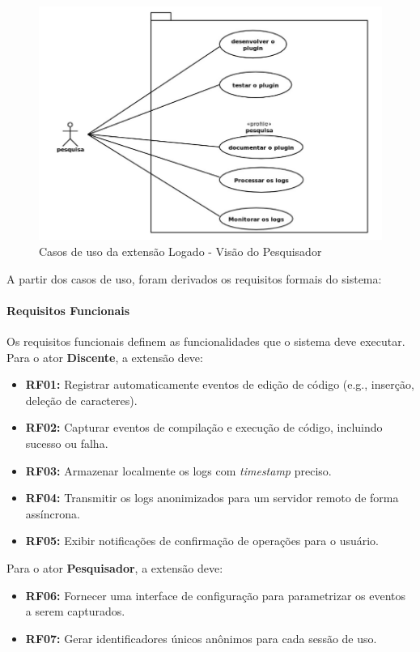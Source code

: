 \begin{figure}[H]
    \centering
    \includegraphics[width=1.1\textwidth]{../figuras/caso-de-uso-pesquisa.png}
    \caption{Casos de uso da extensão Logado - Visão do Pesquisador}
    \label{fig:casos-de-usos-pesquisa}
\end{figure}

A partir dos casos de uso, foram derivados os requisitos formais do sistema:

\paragraph{Requisitos Funcionais}
Os requisitos funcionais definem as funcionalidades que o sistema deve executar. Para o ator \textbf{Discente}, a extensão deve:
\begin{itemize}
    \item \textbf{RF01:} Registrar automaticamente eventos de edição de código (e.g., inserção, deleção de caracteres).
    \item \textbf{RF02:} Capturar eventos de compilação e execução de código, incluindo sucesso ou falha.
    \item \textbf{RF03:} Armazenar localmente os logs com \textit{timestamp} preciso.
    \item \textbf{RF04:} Transmitir os logs anonimizados para um servidor remoto de forma assíncrona.
    \item \textbf{RF05:} Exibir notificações de confirmação de operações para o usuário.
\end{itemize}

Para o ator \textbf{Pesquisador}, a extensão deve:
\begin{itemize}
    \item \textbf{RF06:} Fornecer uma interface de configuração para parametrizar os eventos a serem capturados.
    \item \textbf{RF07:} Gerar identificadores únicos anônimos para cada sessão de uso.
\end{itemize}

